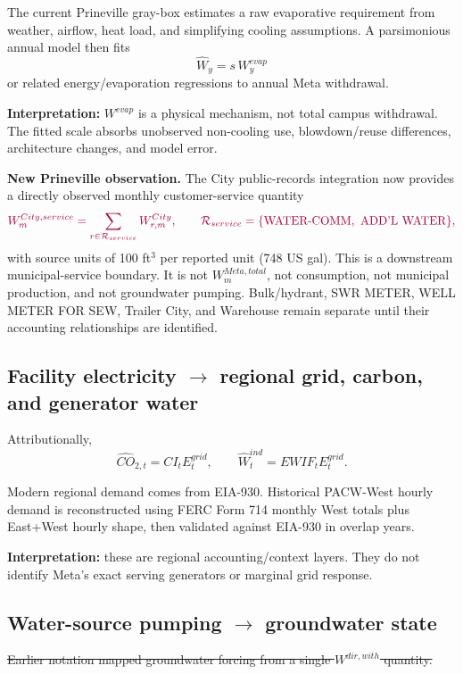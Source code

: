 \documentclass[11pt]{article}
\newcommand{\oldtxt}[1]{\textcolor{blue!70!black}{\sout{#1}}}
\newcommand{\latesttxt}[1]{\textcolor{purple!85!black}{#1}}
\begin{document}
The current Prineville gray-box estimates a raw evaporative requirement from weather, airflow, heat load, and simplifying cooling assumptions. A parsimonious annual model then fits
\[
\widehat W_y=s\,W^{evap}_y
\]
or related energy/evaporation regressions to annual Meta withdrawal.

\textbf{Interpretation:} \(W^{evap}\) is a physical mechanism, not total campus withdrawal. The fitted scale absorbs unobserved non-cooling use, blowdown/reuse differences, architecture changes, and model error.

\latesttxt{\textbf{New Prineville observation.} The City public-records integration now provides a directly observed monthly customer-service quantity}
\[
{\color{purple!85!black}
W^{City,service}_m
=
\sum_{r\in\mathcal R_{service}}W^{City}_{r,m},
\qquad
\mathcal R_{service}=\{\text{WATER-COMM},\ \text{ADD'L WATER}\},
}
\]
\latesttxt{with source units of 100 ft\(^3\) per reported unit (748 US gal). This is a downstream municipal-service boundary. It is not \(W^{Meta,total}_m\), not consumption, not municipal production, and not groundwater pumping. Bulk/hydrant, SWR METER, WELL METER FOR SEW, Trailer City, and Warehouse remain separate until their accounting relationships are identified.}

\subsection[Facility electricity to regional grid, carbon, and generator water]{Facility electricity \(\rightarrow\) regional grid, carbon, and generator water}

Attributionally,
\[
\widehat{CO}_{2,t}=CI_tE^{grid}_t,
\qquad
\widehat W^{ind}_t=EWIF_tE^{grid}_t.
\]

Modern regional demand comes from EIA-930. Historical PACW-West hourly demand is reconstructed using FERC Form 714 monthly West totals plus East+West hourly shape, then validated against EIA-930 in overlap years.

\textbf{Interpretation:} these are regional accounting/context layers. They do not identify Meta's exact serving generators or marginal grid response.

\subsection[Water-source pumping to groundwater state]{Water-source pumping \(\rightarrow\) groundwater state}

\oldtxt{Earlier notation mapped groundwater forcing from a single \(W^{dir,with}\) quantity.}
\end{document}
